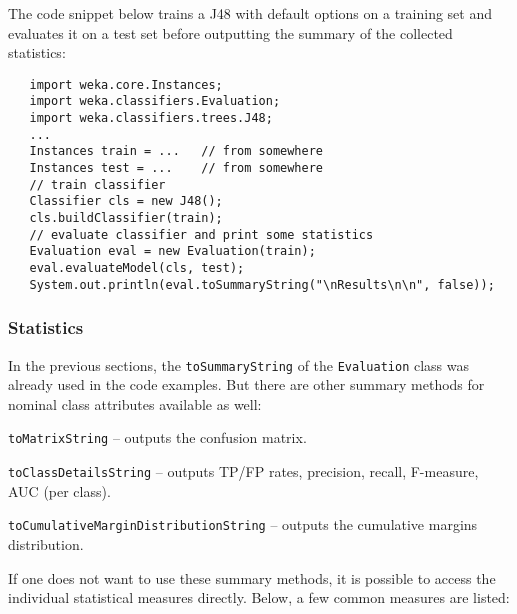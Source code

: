 The code snippet below trains a J48 with default options on a training set and
evaluates it on a test set before outputting the summary of the
collected statistics:
\begin{verbatim}
   import weka.core.Instances;
   import weka.classifiers.Evaluation;
   import weka.classifiers.trees.J48;
   ...
   Instances train = ...   // from somewhere
   Instances test = ...    // from somewhere
   // train classifier
   Classifier cls = new J48();
   cls.buildClassifier(train);
   // evaluate classifier and print some statistics
   Evaluation eval = new Evaluation(train);
   eval.evaluateModel(cls, test);
   System.out.println(eval.toSummaryString("\nResults\n\n", false));
\end{verbatim}

\newpage

\subsubsection*{Statistics}
In the previous sections, the \texttt{toSummaryString} of the
\texttt{Evaluation} class was already used in the code examples. But there are
other summary methods for nominal class attributes available as well:
\begin{tight_itemize}
	\item \texttt{toMatrixString} -- outputs the confusion matrix.
	\item \texttt{toClassDetailsString} -- outputs TP/FP rates, precision,
recall, F-measure, AUC (per class).
	\item \texttt{toCumulativeMarginDistributionString} -- outputs the
cumulative margins distribution.
\end{tight_itemize}
If one does not want to use these summary methods, it is possible to access the
individual statistical measures directly. Below, a few common measures
are listed:
